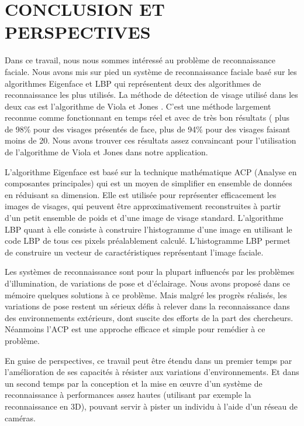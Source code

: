 \chapter*{CONCLUSION ET PERSPECTIVES}

Dans ce travail, nous nous sommes intéressé au problème de reconnaissance faciale. Nous avons mis sur pied un système de reconnaissance faciale basé sur les algorithmes Eigenface et LBP qui représentent deux des algorithmes de reconnaissance les plus utilisés. La méthode de détection de visage utilisé dans les deux cas est l'algorithme de Viola et Jones \cite{VIO}. C'est une méthode largement reconnue comme fonctionnant en temps réel et avec de très bon résultats ( plus de 98\% pour des visages présentés de face, plus de 94\% pour des visages faisant moins de 20\degres. Nous avons trouver ces résultats assez convaincant pour l'utilisation de l'algorithme de Viola et Jones dans notre application.

 L'algorithme Eigenface est basé sur la technique mathématique ACP (Analyse en composantes principales) qui est un moyen de simplifier en ensemble de données en réduisant sa dimension. Elle  est  utilisée  pour  représenter efficacement les images  de visages, qui peuvent être approximativement  reconstruites à partir d'un petit ensemble de poids et d'une image de visage standard. L'algorithme LBP quant à elle consiste à construire l'histogramme d'une image en utilisant le code LBP de tous ces pixels préalablement calculé. L'histogramme LBP permet de construire un vecteur de  caractéristiques représentant l'image faciale.

Les systèmes de reconnaissance sont pour la plupart influencés par les problèmes d'illumination, de variations de pose et d'éclairage. Nous avons proposé dans ce mémoire quelques solutions à ce problème. Mais malgré les progrès réalisés, les variations de pose restent un sérieux défis à relever dans la reconnaissance dans des environnements extérieurs, dont suscite des efforts de la part des chercheurs. Néanmoins l'ACP est une approche efficace et simple pour remédier à ce problème.

En guise de perspectives, ce travail peut être étendu dans un premier temps par l'amélioration de ses capacités à résister aux variations d'environnements. Et dans un second temps par 
la conception et la mise en œuvre d'un système de reconnaissance à performances assez hautes (utilisant par exemple la reconnaissance en 3D), pouvant servir à pister un individu à l'aide d'un réseau de caméras. 
